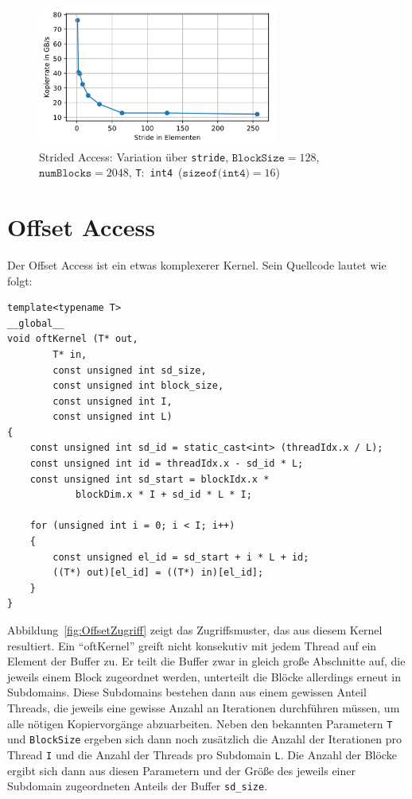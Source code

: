 \documentclass[11pt, abstract=on]{scrartcl}
\begin{document}
\begin{figure} [htbp]
 	\centering
 		\includegraphics[width=0.7\textwidth]{Graph_StridedAccess2.png}
 	 	\caption{Strided Access: Variation über \texttt{stride}, $\texttt{BlockSize} = 128$, $\texttt{numBlocks} = 2048$, \texttt{T}:~\texttt{int4}~($\texttt{sizeof(int4)} = 16$)}
 	\label{fig:StridedAccess2}
\end{figure}

\section{Offset Access}

Der Offset Access ist ein etwas komplexerer Kernel. Sein Quellcode lautet wie folgt:

\begin{lstlisting} 
template<typename T>
__global__
void oftKernel (T* out,
		T* in,
		const unsigned int sd_size,
		const unsigned int block_size,
		const unsigned int I,
		const unsigned int L)
{
	const unsigned int sd_id = static_cast<int> (threadIdx.x / L);
	const unsigned int id = threadIdx.x - sd_id * L;
	const unsigned int sd_start = blockIdx.x *
			blockDim.x * I + sd_id * L * I;
	
	for (unsigned int i = 0; i < I; i++)
	{
		const unsigned el_id = sd_start + i * L + id;
		((T*) out)[el_id] = ((T*) in)[el_id];
	}
}
\end{lstlisting}

Abbildung~\ref{fig:OffsetZugriff} zeigt das Zugriffsmuster, das aus diesem Kernel resultiert. Ein "`oftKernel"' greift nicht konsekutiv mit jedem Thread auf ein Element der Buffer zu. Er teilt die Buffer zwar in gleich große Abschnitte auf, die jeweils einem Block zugeordnet werden, unterteilt die Blöcke allerdings erneut in Subdomains. Diese Subdomains bestehen dann aus einem gewissen Anteil Threads, die jeweils eine gewisse Anzahl an Iterationen durchführen müssen, um alle nötigen Kopiervorgänge abzuarbeiten. Neben den bekannten Parametern \texttt{T} und \texttt{BlockSize} ergeben sich dann noch zusätzlich die Anzahl der Iterationen pro Thread \texttt{I} und die Anzahl der Threads pro Subdomain \texttt{L}. Die Anzahl der Blöcke ergibt sich dann aus diesen Parametern und der Größe des jeweils einer Subdomain zugeordneten Anteils der Buffer \texttt{sd\_size}.
\end{document}
